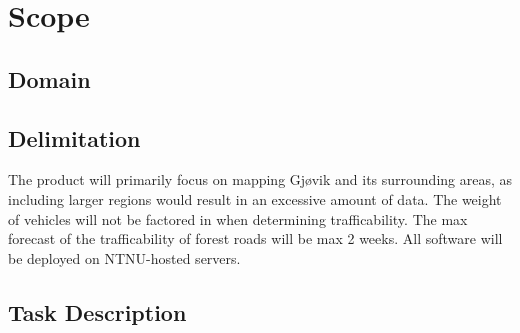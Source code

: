 \section{Scope}
\subsection{Domain}
\subsection{Delimitation}
The product will primarily focus on mapping Gjøvik and its surrounding areas, as including larger regions would result in an excessive amount of data. The weight of vehicles will not be factored in when determining trafficability. The max forecast of the trafficability of forest roads will be max 2 weeks. All software will be deployed on NTNU-hosted servers.
\subsection{Task Description}